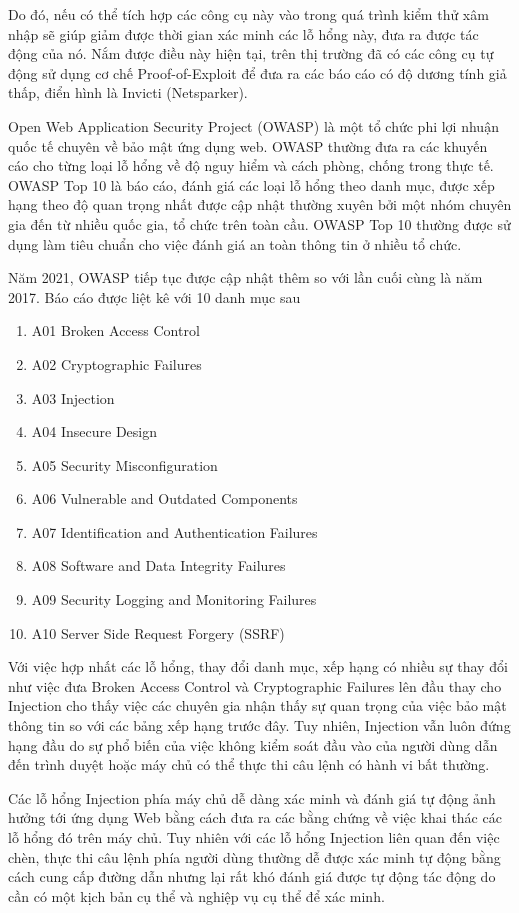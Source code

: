 \documentclass[./../main.tex]{subfiles}
\begin{document}
Do đó, nếu có thể tích hợp các công cụ này vào trong quá trình kiểm thử xâm nhập sẽ giúp giảm được thời gian xác minh các lỗ hổng này, đưa ra được tác động của nó. Nắm được điều này hiện tại, trên thị trường đã có các công cụ tự động sử dụng cơ chế Proof-of-Exploit để đưa ra các báo cáo có độ dương tính giả thấp, điển hình là Invicti (Netsparker).

Open Web Application Security Project (OWASP) là một tổ chức phi lợi nhuận quốc tế chuyên về bảo mật ứng dụng web. OWASP thường đưa ra các khuyến cáo cho từng loại lỗ hổng về độ nguy hiểm và cách phòng, chống trong thực tế. OWASP Top 10 là báo cáo, đánh giá các loại lỗ hổng theo danh mục, được xếp hạng theo độ quan trọng nhất được cập nhật thường xuyên bởi một nhóm chuyên gia đến từ nhiều quốc gia, tổ chức trên toàn cầu. OWASP Top 10 thường được sử dụng làm tiêu chuẩn cho việc đánh giá an toàn thông tin ở nhiều tổ chức.

Năm 2021, OWASP tiếp tục được cập nhật thêm so với lần cuối cùng là năm 2017. Báo cáo được liệt kê với 10 danh mục sau
\begin{enumerate}
	\item A01 Broken Access Control
	\item A02 Cryptographic Failures
	\item A03 Injection
	\item A04 Insecure Design
	\item A05 Security Misconfiguration
	\item A06 Vulnerable and Outdated Components
	\item A07 Identification and Authentication Failures
	\item A08 Software and Data Integrity Failures
	\item A09 Security Logging and Monitoring Failures
	\item A10 Server Side Request Forgery (SSRF)
\end{enumerate}
Với việc hợp nhất các lỗ hổng, thay đổi danh mục, xếp hạng có nhiều sự thay đổi như việc đưa Broken Access Control và Cryptographic Failures lên đầu thay cho Injection cho thấy việc các chuyên gia nhận thấy sự quan trọng của việc bảo mật thông tin so với các bảng xếp hạng trước đây. Tuy nhiên, Injection vẫn luôn đứng hạng đầu do sự phổ biến của việc không kiểm soát đầu vào của người dùng dẫn đến trình duyệt hoặc máy chủ có thể thực thi câu lệnh có hành vi bất thường.

Các lỗ hổng Injection phía máy chủ dễ dàng xác minh và đánh giá tự động ảnh hưởng tới ứng dụng Web bằng cách đưa ra các bằng chứng về việc khai thác các lỗ hổng đó trên máy chủ. Tuy nhiên với các lỗ hổng Injection liên quan đến việc chèn, thực thi câu lệnh phía người dùng thường dễ được xác minh tự động bằng cách cung cấp đường dẫn nhưng lại rất khó đánh giá được tự động tác động do cần có một kịch bản cụ thể và nghiệp vụ cụ thể để xác minh.
\end{document}
